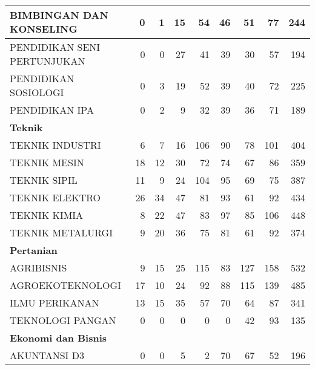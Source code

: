 \documentclass[
]{book}
\begin{document}
\begin{table}[H]
{\begin{tabular}{l|r|r|r|r|r|r|r|r}
\hline
\hspace{1em}BIMBINGAN DAN KONSELING & 0 & 1 & 15 & 54 & 46 & 51 & 77 & 244\\
\hline
\hspace{1em}PENDIDIKAN SENI PERTUNJUKAN & 0 & 0 & 27 & 41 & 39 & 30 & 57 & 194\\
\hline
\hspace{1em}PENDIDIKAN SOSIOLOGI & 0 & 3 & 19 & 52 & 39 & 40 & 72 & 225\\
\hline
\hspace{1em}PENDIDIKAN IPA & 0 & 2 & 9 & 32 & 39 & 36 & 71 & 189\\
\hline
\multicolumn{9}{l}{\textbf{Teknik}}\\
\hline
\hspace{1em}TEKNIK INDUSTRI & 6 & 7 & 16 & 106 & 90 & 78 & 101 & 404\\
\hline
\hspace{1em}TEKNIK MESIN & 18 & 12 & 30 & 72 & 74 & 67 & 86 & 359\\
\hline
\hspace{1em}TEKNIK SIPIL & 11 & 9 & 24 & 104 & 95 & 69 & 75 & 387\\
\hline
\hspace{1em}TEKNIK ELEKTRO & 26 & 34 & 47 & 81 & 93 & 61 & 92 & 434\\
\hline
\hspace{1em}TEKNIK KIMIA & 8 & 22 & 47 & 83 & 97 & 85 & 106 & 448\\
\hline
\hspace{1em}TEKNIK METALURGI & 9 & 20 & 36 & 75 & 81 & 61 & 92 & 374\\
\hline
\multicolumn{9}{l}{\textbf{Pertanian}}\\
\hline
\hspace{1em}AGRIBISNIS & 9 & 15 & 25 & 115 & 83 & 127 & 158 & 532\\
\hline
\hspace{1em}AGROEKOTEKNOLOGI & 17 & 10 & 24 & 92 & 88 & 115 & 139 & 485\\
\hline
\hspace{1em}ILMU PERIKANAN & 13 & 15 & 35 & 57 & 70 & 64 & 87 & 341\\
\hline
\hspace{1em}TEKNOLOGI PANGAN & 0 & 0 & 0 & 0 & 0 & 42 & 93 & 135\\
\hline
\multicolumn{9}{l}{\textbf{Ekonomi dan Bisnis}}\\
\hline
\hspace{1em}AKUNTANSI D3 & 0 & 0 & 5 & 2 & 70 & 67 & 52 & 196\\

\end{tabular}}
\end{table}
\end{document}
